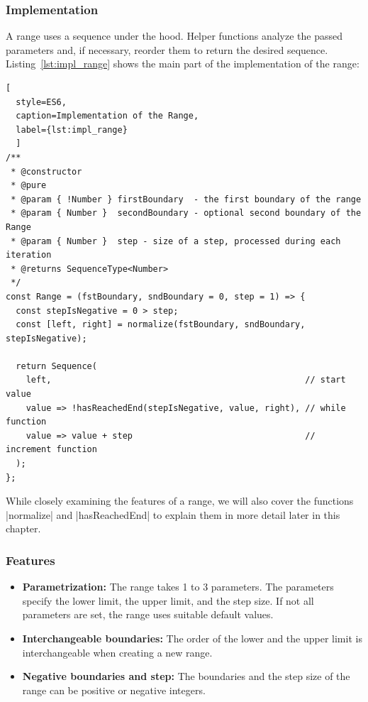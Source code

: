 \subsubsection{Implementation}
\label{subsub:Implementation}
A range uses a sequence under the hood. Helper functions analyze the passed
parameters and, if necessary, reorder them to return the desired sequence.
Listing~\ref{lst:impl_range} shows the main part of the implementation of the
range:

\begin{lstlisting}[
  style=ES6, 
  caption=Implementation of the Range,
  label={lst:impl_range}
  ]
/**
 * @constructor
 * @pure
 * @param { !Number } firstBoundary  - the first boundary of the range
 * @param { Number }  secondBoundary - optional second boundary of the Range
 * @param { Number }  step - size of a step, processed during each iteration
 * @returns SequenceType<Number>
 */
const Range = (fstBoundary, sndBoundary = 0, step = 1) => {
  const stepIsNegative = 0 > step;
  const [left, right] = normalize(fstBoundary, sndBoundary, stepIsNegative);
  
  return Sequence(
    left,                                                  // start value
    value => !hasReachedEnd(stepIsNegative, value, right), // while function
    value => value + step                                  // increment function
  );
};
\end{lstlisting}

While closely examining the features of a range, we will also cover the functions
|normalize| and |hasReachedEnd| to explain them in more detail later in this
chapter.

\subsubsection{Features}
\label{subsub:Features}

\begin{itemize}
  \item \textbf{Parametrization:} The range takes 1 to 3 parameters. The
    parameters specify the lower limit, the upper limit, and the step size. If
  not all parameters are set, the range uses suitable default values.
\item \textbf{Interchangeable boundaries:} The order of the lower and the upper
  limit is interchangeable when creating a new range.
\item \textbf{Negative boundaries and step:} The boundaries and the step size
  of the range can be positive or negative integers.
\end{itemize}

